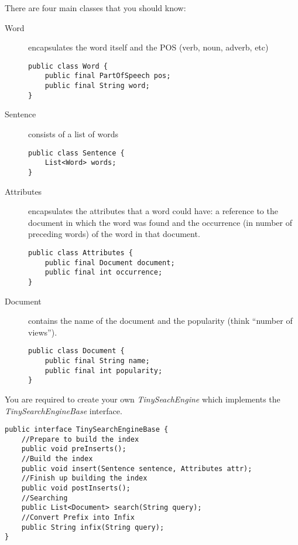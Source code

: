 \documentclass[11pt]{article}
\begin{document}
There are four main classes that you should know:
\begin{description}
\item[Word] encapsulates the word itself and the POS (verb, noun, adverb, etc)

\begin{lstlisting}
public class Word {
    public final PartOfSpeech pos;
    public final String word;
}
\end{lstlisting}

\item[Sentence] consists of a list of words

\begin{lstlisting}
public class Sentence {
    List<Word> words;
}
\end{lstlisting}

\item[Attributes] encapsulates the attributes that a word could have: a reference to the document in which the word was found and the occurrence (in number of preceding words) of the word in that document.
\begin{lstlisting}
public class Attributes {
    public final Document document;
    public final int occurrence;
}
\end{lstlisting}
\item[Document] contains the name of the document and the popularity (think ``number of views'').
\begin{lstlisting}
public class Document {
    public final String name;
    public final int popularity;
}
\end{lstlisting}
\end{description}

You are required to create your own \textit{TinySeachEngine} which implements the \textit{TinySearchEngineBase} interface.

\begin{lstlisting}
public interface TinySearchEngineBase {
    //Prepare to build the index
    public void preInserts();
    //Build the index
    public void insert(Sentence sentence, Attributes attr);
    //Finish up building the index
    public void postInserts();
    //Searching
    public List<Document> search(String query);
    //Convert Prefix into Infix
    public String infix(String query);
}
\end{lstlisting}
\end{document}

